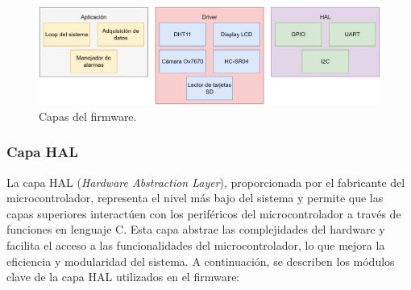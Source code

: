 \vspace{1cm}

\begin{figure}[htbp]
	\centering
	\includegraphics[width=1\textwidth, height=0.29\textheight]{./Figures/firmware_general.png}
	\caption{Capas del firmware.}
	\label{fig:firmware_general}
\end{figure}

\vspace{1cm}

\subsubsection{Capa HAL}

La capa HAL (\textit{Hardware Abstraction Layer}), proporcionada por el fabricante del microcontrolador, representa el nivel más bajo del sistema y permite que las capas superiores interactúen con los periféricos del microcontrolador a través de funciones en lenguaje C. Esta capa abstrae las complejidades del hardware y facilita el acceso a las funcionalidades del microcontrolador, lo que mejora la eficiencia y modularidad del sistema. A continuación, se describen los módulos clave de la capa HAL utilizados en el firmware:

